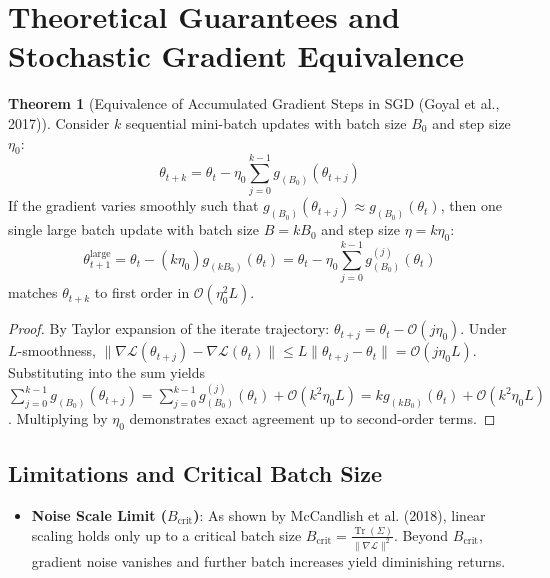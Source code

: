 \documentclass[11pt,a4paper]{article}
\theoremstyle{definition}
\newtheorem{theorem}{Theorem}[section]
\begin{document}
\section{Theoretical Guarantees and Stochastic Gradient Equivalence}

\begin{theorem}[Equivalence of Accumulated Gradient Steps in SGD (Goyal et al., 2017)]
Consider $k$ sequential mini-batch updates with batch size $B_0$ and step size $\eta_0$:
\begin{equation}
\theta_{t+k} = \theta_t - \eta_0 \sum_{j=0}^{k-1} g_{(B_0)}(\theta_{t+j})
\end{equation}
If the gradient varies smoothly such that $g_{(B_0)}(\theta_{t+j}) \approx g_{(B_0)}(\theta_t)$, then one single large batch update with batch size $B = k B_0$ and step size $\eta = k \eta_0$:
\begin{equation}
\theta_{t+1}^{\text{large}} = \theta_t - (k \eta_0) g_{(k B_0)}(\theta_t) = \theta_t - \eta_0 \sum_{j=0}^{k-1} g_{(B_0)}^{(j)}(\theta_t)
\end{equation}
matches $\theta_{t+k}$ to first order in $\mathcal{O}(\eta_0^2 L)$.
\end{theorem}

\begin{proof}
By Taylor expansion of the iterate trajectory: $\theta_{t+j} = \theta_t - \mathcal{O}(j \eta_0)$. Under $L$-smoothness, $\|\nabla \mathcal{L}(\theta_{t+j}) - \nabla \mathcal{L}(\theta_t)\| \le L \|\theta_{t+j} - \theta_t\| = \mathcal{O}(j \eta_0 L)$. Substituting into the sum yields $\sum_{j=0}^{k-1} g_{(B_0)}(\theta_{t+j}) = \sum_{j=0}^{k-1} g_{(B_0)}^{(j)}(\theta_t) + \mathcal{O}(k^2 \eta_0 L) = k g_{(k B_0)}(\theta_t) + \mathcal{O}(k^2 \eta_0 L)$. Multiplying by $\eta_0$ demonstrates exact agreement up to second-order terms.
\end{proof}

\subsection{Limitations and Critical Batch Size}
\begin{itemize}
    \item \textbf{Noise Scale Limit ($B_{\text{crit}}$)}: As shown by McCandlish et al. (2018), linear scaling holds only up to a critical batch size $B_{\text{crit}} = \frac{\operatorname{Tr}(\Sigma)}{\|\nabla \mathcal{L}\|^2}$. Beyond $B_{\text{crit}}$, gradient noise vanishes and further batch increases yield diminishing returns.
\end{itemize}
\end{document}
